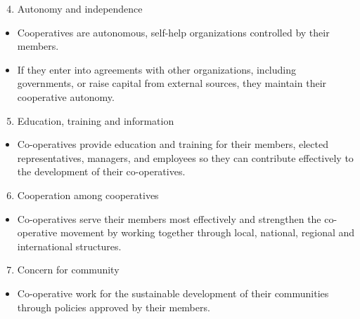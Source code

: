 \documentclass[12pt,ignorenonframetext,aspectratio=169]{beamer}
\providecommand{\tightlist}{%
  \setlength{\itemsep}{0pt}\setlength{\parskip}{0pt}}
\begin{document}
\begin{frame}{}
\protect\hypertarget{section}{}
\footnotesize

\begin{enumerate}
\setcounter{enumi}{3}
\tightlist
\item
  Autonomy and independence
\end{enumerate}

\begin{itemize}
\tightlist
\item
  Cooperatives are autonomous, self-help organizations controlled by
  their members.
\item
  If they enter into agreements with other organizations, including
  governments, or raise capital from external sources, they maintain
  their cooperative autonomy.
\end{itemize}

\begin{enumerate}
\setcounter{enumi}{4}
\tightlist
\item
  Education, training and information
\end{enumerate}

\begin{itemize}
\tightlist
\item
  Co-operatives provide education and training for their members,
  elected representatives, managers, and employees so they can
  contribute effectively to the development of their co-operatives.
\end{itemize}
\end{frame}

\begin{frame}{}
\protect\hypertarget{section-1}{}
\begin{enumerate}
\setcounter{enumi}{5}
\tightlist
\item
  Cooperation among cooperatives
\end{enumerate}

\begin{itemize}
\tightlist
\item
  Co-operatives serve their members most effectively and strengthen the
  co-operative movement by working together through local, national,
  regional and international structures.
\end{itemize}

\begin{enumerate}
\setcounter{enumi}{6}
\tightlist
\item
  Concern for community
\end{enumerate}

\begin{itemize}
\tightlist
\item
  Co-operative work for the sustainable development of their communities
  through policies approved by their members.
\end{itemize}
\end{frame}
\end{document}
